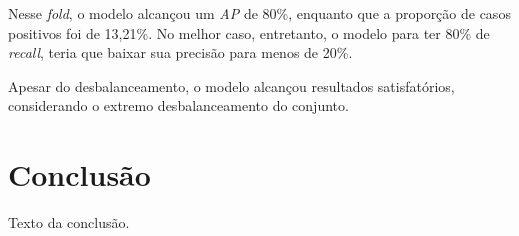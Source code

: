 \documentclass[
    12pt,                %
    openright,           %
    oneside,             %
    a4paper,             %
    brazil               %
]{abntex2}
\begin{document}
Nesse \textit{fold}, o modelo alcançou um \textit{AP} de 80\%, enquanto que a proporção de casos positivos foi de 13,21\%. No melhor caso, 
entretanto, o modelo para ter 80\% de \textit{recall}, teria que baixar sua precisão para menos de 20\%. 

Apesar do desbalanceamento, o modelo alcançou resultados satisfatórios, considerando o extremo desbalanceamento do conjunto.

\chapter{Conclusão}

Texto da conclusão.



\end{document}
